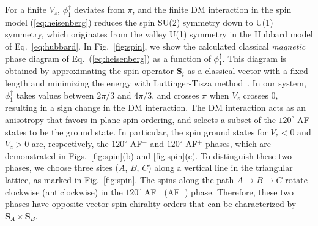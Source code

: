\documentclass[aps,prx,floatfix,twocolumn]{revtex4-1}
\begin{document}
	For a finite $V_z$, $ \phi_{1}^{\uparrow} $ deviates from $\pi$, and the finite DM interaction in the spin model (\ref{eq:heisenberg}) reduces the spin SU(2) symmetry down to U(1) symmetry, which originates from the valley U(1) symmetry in the Hubbard model of Eq.~\eqref{eq:hubbard}. In Fig.~\ref{fig:spin}, we show the calculated classical \textit{magnetic} phase diagram of Eq.~(\ref{eq:heisenberg}) as a function of $\phi_{1}^{\uparrow}$. This diagram is obtained by approximating the spin operator $\bm{S}_i$ as a classical vector with a fixed length and minimizing the energy with Luttinger-Tisza method~\cite{luttinger1946theory}. In our system, $ \phi_{1}^{\uparrow} $ takes values between $2\pi/3$ and $4\pi/3$, and crosses $ \pi $ when $ V_z $ crosses 0, resulting in a sign change in the DM interaction. The DM interaction acts as an anisotropy that favors in-plane spin ordering, and selects a subset of the $120^{\circ}$ AF states to be the ground state.  In particular, the spin ground states for $ V_z<0 $ and $ V_z>0 $ are, respectively, the $120^{\circ}$ AF$^-$ and $120^{\circ}$ AF$^+$ phases, which are demonstrated in Figs.~\ref{fig:spin}(b) and \ref{fig:spin}(c). To distinguish these two phases, we choose three sites ($A$, $B$, $C$) along a vertical line in the triangular lattice, as marked in Fig.~\ref{fig:spin}. The spins along the path $A \rightarrow B \rightarrow C$ rotate clockwise (anticlockwise) in the  $120^{\circ}$ AF$^-$ (AF$^+$) phase. Therefore, these two phases have opposite vector-spin-chirality orders that can be characterized by $\bm{S}_A \times \bm{S}_B$. 
\end{document}
